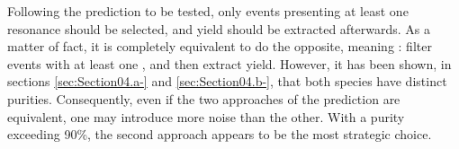 Following the prediction to be tested, only events presenting at least one \rmPhiMes resonance should be selected, and \rmOmega yield should be extracted afterwards. As a matter of fact, it is completely equivalent to do the opposite, meaning : filter events with at least one \rmOmega, and then extract \rmPhiMes yield. However, it has been shown, in sections \ref{sec:Section04.a-} and \ref{sec:Section04.b-}, that both species have distinct purities. Consequently, even if the two approaches of the \Pythiaeight prediction are equivalent, one may introduce more noise than the other. With a purity exceeding 90\%, the second approach appears to be the most strategic choice. 
